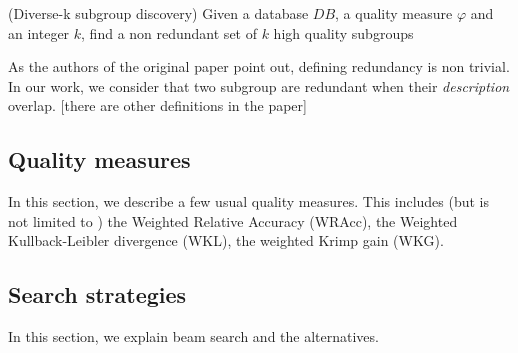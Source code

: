 \begin{problem}
    (Diverse-k subgroup discovery) Given a database $DB$, a quality measure
    $\varphi$ and an integer $k$, find a non redundant set of $k$ high quality subgroups
\end{problem}

As the authors of the original paper point out, defining redundancy 
is non trivial. In our work, we consider that two subgroup are redundant when
their \emph{description} overlap. [there are other definitions in the paper]

\subsection{Quality measures}
In this section, we describe a few usual quality measures. This includes (but
is not limited to ) the Weighted Relative Accuracy (WRAcc), the Weighted
Kullback-Leibler divergence (WKL), the weighted Krimp gain (WKG).

\subsection{Search strategies}
In this section, we explain beam search and the alternatives.
